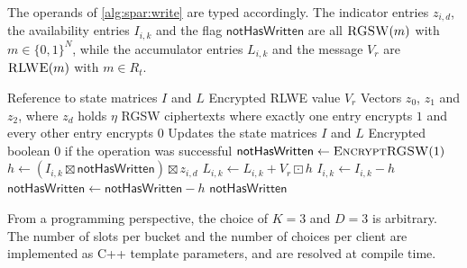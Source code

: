 The operands of \autoref{alg:spar:write} are typed accordingly. The indicator entries $z_{i,d}$, the availability entries $I_{i,k}$ and the flag $\mathsf{notHasWritten}$ are all $\Call{RGSW}{m}$ with $m \in \{0,1\}^N$, while the accumulator entries $L_{i,k}$ and the message $V_r$ are $\Call{RLWE}{m}$ with $m \in R_t$.

\begin{algorithm}
\caption{\protect\serverWrite{}}
\label{alg:spar:write}
\begin{algorithmic}[1]
\Require Reference to state matrices $I$ and $L$
\Require Encrypted RLWE value $V_r$
\Require Vectors $z_0$, $z_1$ and $z_2$, where $z_d$ holds $\eta$ RGSW ciphertexts where exactly one entry encrypts $1$ and every other entry encrypts $0$
\Ensure Updates the state matrices $I$ and $L$
\Ensure Encrypted boolean $0$ if the operation was successful %
\State $\mathsf{notHasWritten} \gets \Call{EncryptRGSW}{1}$
        \For{$i \gets [0, \eta)$}
            \State $h\gets (I_{i,k}\boxtimes \mathsf{notHasWritten}) \boxtimes z_{i,d}$
            \State $L_{i,k} \gets L_{i,k} + V_r \boxdot h$
            \State $I_{i,k} \gets I_{i,k} - h$
            \State $\mathsf{notHasWritten} \gets \mathsf{notHasWritten} - h$
        \EndFor
    \EndFor
\EndFor
\State \Return $\mathsf{notHasWritten}$
\end{algorithmic}
\end{algorithm}

\begin{remark}
    From a programming perspective, the choice of $K = 3$ and $D = 3$ is arbitrary. The number of slots per bucket and the number of choices per client are implemented as C++ template parameters, and are resolved at compile time. %
\end{remark}
